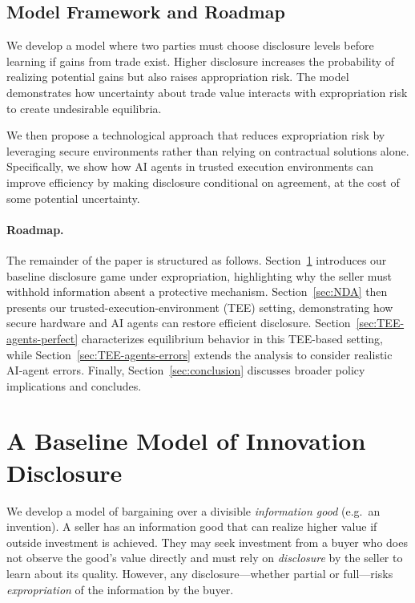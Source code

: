 \documentclass{article}
\begin{document}
\subsection{Model Framework and Roadmap}

We develop a model where two parties must choose disclosure levels before learning if gains from trade exist. Higher disclosure increases the probability of realizing potential gains but also raises appropriation risk. The model demonstrates how uncertainty about trade value interacts with expropriation risk to create undesirable equilibria.

We then propose a technological approach that reduces expropriation risk by leveraging secure environments rather than relying on contractual solutions alone. Specifically, we show how AI agents in trusted execution environments can improve efficiency by making disclosure conditional on agreement, at the cost of some potential uncertainty.

\paragraph{Roadmap.}
The remainder of the paper is structured as follows.
Section~\ref{sec:model} introduces our baseline disclosure game under expropriation,
highlighting why the seller must withhold information absent a protective mechanism.
Section~\ref{sec:NDA} then presents our trusted-execution-environment (TEE) setting,
demonstrating how secure hardware and AI agents can restore efficient disclosure.
Section~\ref{sec:TEE-agents-perfect} characterizes equilibrium behavior in this TEE-based setting,
while Section~\ref{sec:TEE-agents-errors} extends the analysis to consider realistic AI‐agent errors.
Finally, Section~\ref{sec:conclusion} discusses broader policy implications and concludes.

\bigskip

\section{A Baseline Model of Innovation Disclosure}
\label{sec:model}
We develop a model of bargaining over a divisible \emph{information good} (e.g.\ an invention). A seller has an information good that can realize higher value if outside investment is achieved. They may seek investment from a buyer who does not observe the good's value directly and must rely on \emph{disclosure} by the seller to learn about its quality. However, any disclosure—whether partial or full—risks \emph{expropriation} of the 
information by the buyer.
\end{document}
